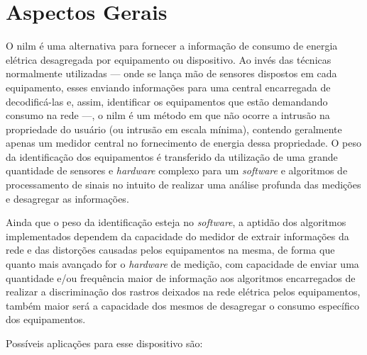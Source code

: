 \section{Aspectos Gerais}
\label{sec:nilm_aspec_gerais}

O \gls{nilm} é uma alternativa para fornecer a informação de consumo
de energia elétrica desagregada por equipamento ou dispositivo. Ao
invés das técnicas normalmente utilizadas --- onde se lança mão de
sensores dispostos em cada equipamento, esses enviando informações
para uma central encarregada de decodificá-las e, assim, identificar
os equipamentos que estão demandando consumo na rede ---, o \gls{nilm}
é um método em que não ocorre a intrusão na propriedade do usuário (ou
intrusão em escala mínima), contendo geralmente apenas um medidor
central no fornecimento de energia dessa propriedade. O peso da
identificação dos equipamentos é transferido da utilização de uma
grande quantidade de sensores e \emph{hardware} complexo para um
\emph{software} e algoritmos de processamento de sinais no intuito de
realizar uma análise profunda das medições e desagregar as
informações.

Ainda que o peso da identificação esteja no \emph{software}, a
aptidão dos algoritmos implementados dependem da capacidade do
medidor de extrair informações da rede e das distorções causadas pelos
equipamentos na mesma, de forma que quanto mais avançado for o
\emph{hardware} de medição, com capacidade de enviar uma quantidade e/ou frequência
maior de informação aos algoritmos encarregados de realizar a
discriminação dos rastros deixados na rede elétrica pelos equipamentos,
também maior será a capacidade dos mesmos de desagregar o consumo
específico dos equipamentos.

Possíveis aplicações para esse dispositivo são: 

